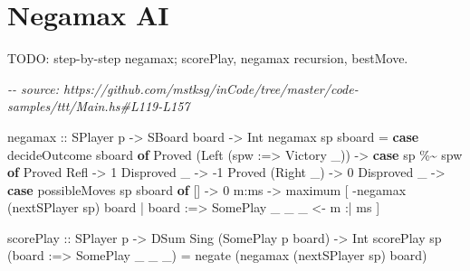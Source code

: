 \documentclass[]{article}
\newenvironment{Shaded}{}{}
\newcommand{\CommentTok}[1]{\textcolor[rgb]{0.38,0.63,0.69}{\textit{#1}}}
\newcommand{\DataTypeTok}[1]{\textcolor[rgb]{0.56,0.13,0.00}{#1}}
\newcommand{\DecValTok}[1]{\textcolor[rgb]{0.25,0.63,0.44}{#1}}
\newcommand{\FunctionTok}[1]{\textcolor[rgb]{0.02,0.16,0.49}{#1}}
\newcommand{\KeywordTok}[1]{\textcolor[rgb]{0.00,0.44,0.13}{\textbf{#1}}}
\newcommand{\NormalTok}[1]{#1}
\newcommand{\OperatorTok}[1]{\textcolor[rgb]{0.40,0.40,0.40}{#1}}
\newcommand{\OtherTok}[1]{\textcolor[rgb]{0.00,0.44,0.13}{#1}}
\begin{document}
\section{Negamax AI}\label{negamax-ai}

TODO: step-by-step negamax; scorePlay, negamax recursion, bestMove.

\begin{Shaded}
\begin{Highlighting}[]
\CommentTok{{-}{-} source: https://github.com/mstksg/inCode/tree/master/code{-}samples/ttt/Main.hs\#L119{-}L157}

\OtherTok{negamax ::} \DataTypeTok{SPlayer}\NormalTok{ p }\OtherTok{{-}\textgreater{}} \DataTypeTok{SBoard}\NormalTok{ board }\OtherTok{{-}\textgreater{}} \DataTypeTok{Int}
\NormalTok{negamax sp sboard }\OtherTok{=}
    \KeywordTok{case}\NormalTok{ decideOutcome sboard }\KeywordTok{of}
        \DataTypeTok{Proved}\NormalTok{ (}\DataTypeTok{Left}\NormalTok{ (spw }\OperatorTok{:=\textgreater{}} \DataTypeTok{Victory}\NormalTok{ \_)) }\OtherTok{{-}\textgreater{}}
            \KeywordTok{case}\NormalTok{ sp }\OperatorTok{\%\textasciitilde{}}\NormalTok{ spw }\KeywordTok{of}
                \DataTypeTok{Proved} \DataTypeTok{Refl} \OtherTok{{-}\textgreater{}} \DecValTok{1}
                \DataTypeTok{Disproved}\NormalTok{ \_ }\OtherTok{{-}\textgreater{}} \OperatorTok{{-}}\DecValTok{1}
        \DataTypeTok{Proved}\NormalTok{ (}\DataTypeTok{Right}\NormalTok{ \_) }\OtherTok{{-}\textgreater{}} \DecValTok{0}
        \DataTypeTok{Disproved}\NormalTok{ \_ }\OtherTok{{-}\textgreater{}}
            \KeywordTok{case}\NormalTok{ possibleMoves sp sboard }\KeywordTok{of}
\NormalTok{                [] }\OtherTok{{-}\textgreater{}} \DecValTok{0}
\NormalTok{                m}\OperatorTok{:}\NormalTok{ms }\OtherTok{{-}\textgreater{}}
                    \FunctionTok{maximum}
\NormalTok{                        [ }\OperatorTok{{-}}\NormalTok{negamax (nextSPlayer sp) board\textquotesingle{}}
                        \OperatorTok{|}\NormalTok{ board\textquotesingle{} }\OperatorTok{:=\textgreater{}} \DataTypeTok{SomePlay}\NormalTok{ \_ \_ \_ }\OtherTok{\textless{}{-}}\NormalTok{ m }\OperatorTok{:|}\NormalTok{ ms}
\NormalTok{                        ]}

\NormalTok{scorePlay}
\OtherTok{    ::} \DataTypeTok{SPlayer}\NormalTok{ p}
    \OtherTok{{-}\textgreater{}} \DataTypeTok{DSum} \DataTypeTok{Sing}\NormalTok{ (}\DataTypeTok{SomePlay}\NormalTok{ p board)}
    \OtherTok{{-}\textgreater{}} \DataTypeTok{Int}
\NormalTok{scorePlay sp (board\textquotesingle{} }\OperatorTok{:=\textgreater{}} \DataTypeTok{SomePlay}\NormalTok{ \_ \_ \_) }\OtherTok{=} \FunctionTok{negate}\NormalTok{ (negamax (nextSPlayer sp) board\textquotesingle{})}


\end{Highlighting}
\end{Shaded}
\end{document}
